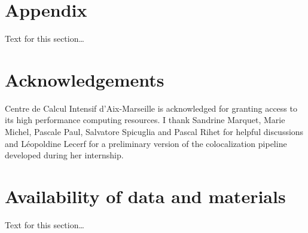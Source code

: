 \documentclass[doublespacing,linenumbers]{bmcart}
\begin{document}

    
    
    
    
%  


    \section*{Appendix}
    Text for this section\ldots


    \begin{backmatter}

        \section*{Acknowledgements}%
        Centre de Calcul Intensif d'Aix-Marseille is acknowledged for granting access to its high performance computing resources.
%
        I thank Sandrine Marquet, Marie Michel, Pascale Paul, Salvatore Spicuglia and Pascal Rihet for helpful discussions and Léopoldine Lecerf for a preliminary version of the colocalization pipeline developed during her internship.



        \section*{Availability of data and materials}%
        Text for this section\ldots



\end{backmatter}
\end{document}
